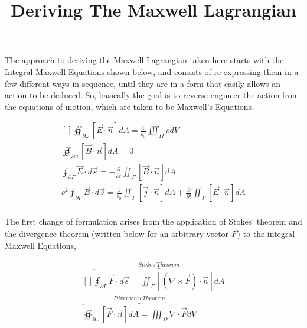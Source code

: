 \documentclass[a4]{article}
\begin{document}
    \title{Deriving The Maxwell Lagrangian}
    \maketitle

    The approach to deriving the Maxwell Lagrangian taken here starts with the Integral Maxwell Equations shown below, and consists of re-expressing them in a few different ways in sequence,
    until they are in a form that easily allows an action to be deduced. So, basically the goal is to reverse engineer the action from the equations of motion, which are taken to be Maxwell's
    Equations.

    \begin{framed}
        \begin{equation}
            \begin{aligned}[]
                \oiint_{\partial \omega} [ \vec{E} \cdot \vec{n}] dA = \frac{1}{\epsilon_0} \iiint_{\Omega} \rho dV \\
                \oiint_{\partial \omega} [ \vec{B} \cdot \vec{n}] dA = 0 \\
                \oint_{\partial \Gamma} \vec{E} \cdot d\vec{s} = - \frac{\partial}{\partial t} \iint_{\Gamma} [\vec{B} \cdot \vec{n}] dA \\
                c^2 \oint_{\partial \Gamma} \vec{B} \cdot d\vec{s} = \frac{1}{\epsilon_0} \iint_{\Gamma} [\vec{j} \cdot \vec{n}] dA + \frac{\partial}{\partial t} \iint_{\Gamma} [\vec{E} \cdot \vec{n}] dA \\
            \end{aligned}
        \end{equation}
    \end{framed}

    The first change of formulation arises from the application of Stokes' theorem and the divergence theorem (written below for an arbitrary vector $\vec{F}$) to the integral Maxwell Equations,

    \begin{framed}
        \begin{equation}
            \begin{aligned}[]
                \overbrace{\oint_{\partial \Gamma} \vec{F} \cdot d\vec{s} = \iint_{\Gamma} [(\nabla \times \vec{F}) \cdot \vec{n}]dA}^{Stokes' Theorem} \\
                \overbrace{\oiint_{\partial \omega} [\vec{F} \cdot \vec{n}] dA = \iiint_{\Omega} \nabla \cdot \vec{F} dV}^{Divergence Theorem}
            \end{aligned}
        \end{equation}
    \end{framed}
\end{document}
